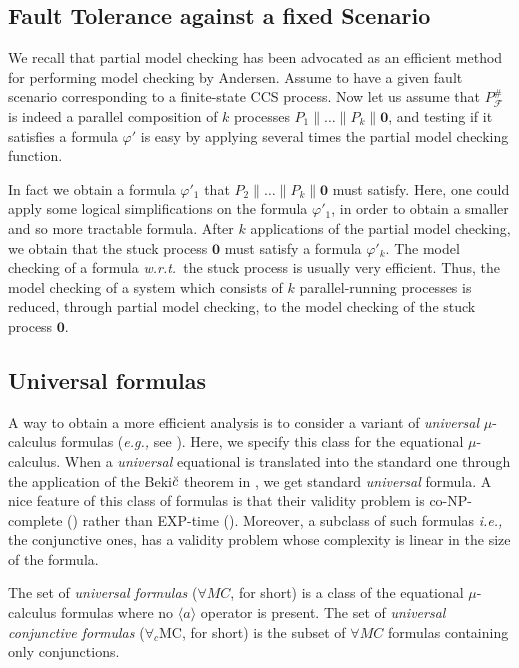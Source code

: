 \documentclass{entcs}
\newcommand{\eg}{\emph{e.g., }}
\newcommand{\ie}{\emph{i.e., }}
\newcommand{\wrt}{\emph{w.r.t.~}}
\newcommand{\dia}[1]{\langle #1 \rangle}
\newcommand{\pdc}{\|}
\newcommand{\Faults}{\mathcal{F}}
\newcommand{\faulttolerant}[1]{{#1}^{\#}_\Faults}
\renewcommand{\stop}{\mathbf{0}}
\begin{document}
\subsection{Fault Tolerance against a fixed Scenario}
We recall that partial model checking has been advocated as an
efficient method for performing model checking by Andersen. Assume to
have a given fault scenario corresponding to a finite-state CCS
process. Now let us assume that $\faulttolerant{P}$ is indeed a
parallel composition of $k$ processes $P_{1}\pdc \ldots \pdc P_{k}
\parallel \stop$, and testing if it satisfies a formula $\varphi'$ is easy by
applying several times the partial model checking function.

In fact we obtain a formula $\varphi'_{1}$ that $P_{2} \parallel \ldots
\parallel P_{k} \parallel \stop$ must satisfy.  Here, one could apply some
logical simplifications on the formula $\varphi'_{1}$, in order to
obtain a smaller and so more tractable formula.  After $k$
applications of the partial model checking, we obtain that the stuck
process $\stop$ must satisfy a formula $\varphi'_{k}$.  The model
checking of a formula \wrt the stuck process is usually very
efficient.  Thus, the model checking of a system which consists of $k$
parallel-running processes is reduced, through partial model checking,
to the model checking of the stuck process $\stop$.

\subsection{Universal formulas}

A way to obtain a more efficient analysis is to consider a variant of {\em
universal } $\mu$-calculus formulas (\eg see \cite{kupf}).  Here, we specify
this class for the equational $\mu$-calculus. When a {\em universal}
equational is translated into the standard one through the application of the
Beki$\breve{{\rm c}}$ theorem in \cite{bekic}, we get standard {\em universal}
formula.  A nice feature of this class of formulas is that their validity
problem is co-NP-complete (\cite{kupf}) rather than EXP-time (\cite{Street89}). Moreover, a
subclass of such formulas \ie the conjunctive ones, has a validity problem
whose complexity is linear in the size of the formula.

\begin{definition}
  The set of \emph{universal formulas} ($\forall MC$, for short) is a
  class of the equational $\mu$-calculus formulas where no $\dia{a}$
  operator is present.  The set of {\em universal conjunctive formulas}
  ($\forall_{c}$MC, for short) is the subset of $\forall MC$ formulas
  containing only conjunctions.
\end{definition}
\end{document}
